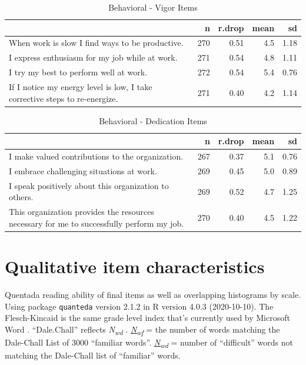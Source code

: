\documentclass[
]{book}
\begin{document}
\begin{table}

\caption{\label{tab:rdrop14}Behavioral - Vigor Items}
\centering
\begin{tabular}[t]{l|r|r|r|r}
\hline
  & n & r.drop & mean & sd\\
\hline
When work is slow I find ways to be productive. & 270 & 0.51 & 4.5 & 1.18\\
\hline
I express enthusiasm for my job while at work. & 271 & 0.54 & 4.8 & 1.11\\
\hline
I try my best to perform well at work. & 272 & 0.54 & 5.4 & 0.76\\
\hline
If I notice my energy level is low, I take corrective steps to re-energize. & 271 & 0.40 & 4.2 & 1.14\\
\hline
\end{tabular}
\end{table}

\begin{table}

\caption{\label{tab:rdrop15}Behavioral - Dedication Items}
\centering
\begin{tabular}[t]{l|r|r|r|r}
\hline
  & n & r.drop & mean & sd\\
\hline
I make valued contributions to the organization. & 267 & 0.37 & 5.1 & 0.76\\
\hline
I embrace challenging situations at work. & 269 & 0.45 & 5.0 & 0.89\\
\hline
I speak positively about this organization to others. & 269 & 0.52 & 4.7 & 1.25\\
\hline
This organization provides the resources necessary for me to successfully perform my job. & 270 & 0.40 & 4.5 & 1.22\\
\hline
\end{tabular}
\end{table}

\hypertarget{qualitative}{%
\chapter{Qualitative item characteristics}\label{qualitative}}

Quentada reading ability of final items as well as overlapping histograms by scale. Using package \texttt{quanteda} version 2.1.2 \citep{R-quanteda} in R version 4.0.3 (2020-10-10). The Flesch-Kincaid is the same grade level index that's currently used by Microsoft Word \citep{kincaid_derivation_1975}. ``Dale.Chall'' reflects \emph{N\textsubscript{wd}} \citep[``difficulty'' of words;][]{chall_dale_1995}. \href{https://quanteda.io/reference/textstat_readability.html}{\emph{N\textsubscript{wf}}} = the number of words matching the Dale-Chall List of 3000 ``familiar words''. \href{https://quanteda.io/reference/textstat_readability.html}{\emph{N\textsubscript{wd}}} = number of ``difficult'' words not matching the Dale-Chall list of ``familiar'' words.
\end{document}
